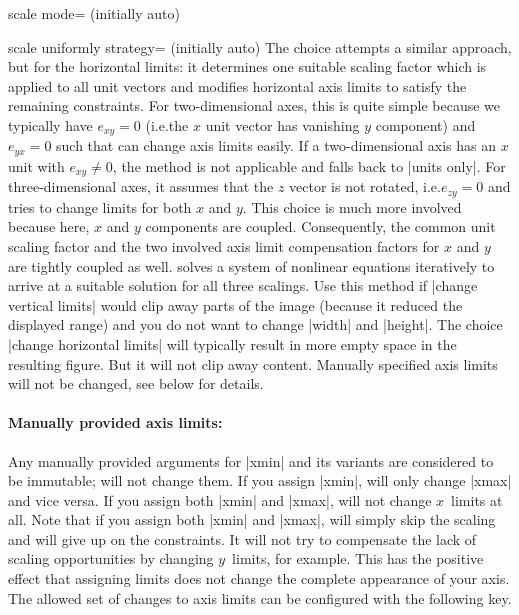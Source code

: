 \begin{pgfplotskey}{scale mode= (initially auto)}
\begin{pgfplotskey}{scale uniformly strategy= (initially auto)%
    }
        The choice  attempts a similar
        approach, but for the horizontal limits: it determines one suitable
        scaling factor which is applied to all unit vectors and modifies
        horizontal axis limits to satisfy the remaining constraints. For
        two-dimensional axes, this is quite simple because we typically have
        $e_{xy} = 0$ (i.e.\@ the $x$ unit vector has vanishing $y$ component)
        and $e_{yx}=0$ such that \PGFPlots{} can change axis limits easily. If
        a two-dimensional axis has an $x$ unit with $e_{xy} \neq 0$, the method
        is not applicable and falls back to |units only|. For three-dimensional
        axes, it assumes that the $z$ vector is not rotated, i.e.\@ $e_{zy} =
        0$ and tries to change limits for both $x$ and $y$. This choice is much
        more involved because here, $x$ and $y$ components are coupled.
        Consequently, the common unit scaling factor and the two involved axis
        limit compensation factors for $x$ and $y$ are tightly coupled as well.
        \PGFPlots{} solves a system of nonlinear equations iteratively to
        arrive at a suitable solution for all three scalings. Use this method
        if |change vertical limits| would clip away parts of the image (because
        it reduced the displayed range) and you do not want to change |width|
        and |height|. The choice |change horizontal limits| will typically
        result in more empty space in the resulting figure. But it will not
        clip away content. Manually specified axis limits will not be changed,
        see below for details.
    \end{pgfplotskey}


    \paragraph{Manually provided axis limits:}

    Any manually provided arguments for |xmin| and its variants are considered
    to be immutable; \PGFPlots{} will not change them. If you assign |xmin|,
    \PGFPlots{} will only change |xmax| and vice versa. If you assign both
    |xmin| and |xmax|, \PGFPlots{} will not change $x$~limits at all. Note that
    if you assign both |xmin| and |xmax|, \PGFPlots{} will simply skip the
    scaling and will give up on the constraints. It will not try to compensate
    the lack of scaling opportunities by changing $y$~limits, for example. This
    has the positive effect that assigning limits does not change the complete
    appearance of your axis.  The allowed set of changes to axis limits can be
    configured with the following key.



\end{pgfplotskey}
